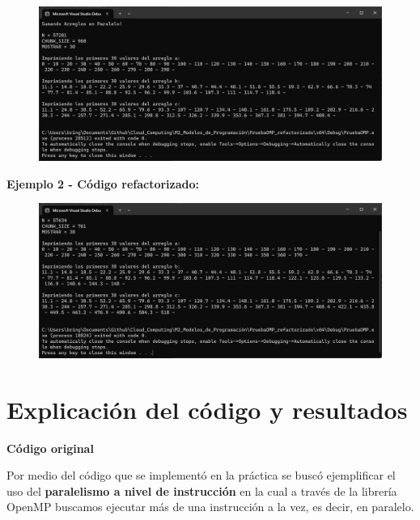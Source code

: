 \documentclass[12pt,a4paper]{article}
\begin{document}
\begin{figure}[H]
    \centering
    \includegraphics[width=1\linewidth]{M2_Modelos_de_Programación/reporte/figuras/Código_refactorizado_ejemplo-1.png}
    \label{fig:Código_refactorizado_ejemplo-1}
\end{figure}


\textbf{Ejemplo 2 - Código refactorizado:}

\begin{figure}[H]
    \centering
    \includegraphics[width=1\linewidth]{M2_Modelos_de_Programación/reporte/figuras/Código_refactorizado_ejemplo-2.png}
    \label{fig:Código_refactorizado_ejemplo-2}
\end{figure}


\section{Explicación del código y resultados}

\textbf{Código original}

\vspace{1em}

Por medio del código que se implementó en la práctica se buscó ejemplificar el uso del \textbf{paralelismo a nivel de instrucción} en la cual a través de la librería OpenMP buscamos ejecutar más de una instrucción a la vez, es decir, en paralelo.
\end{document}
